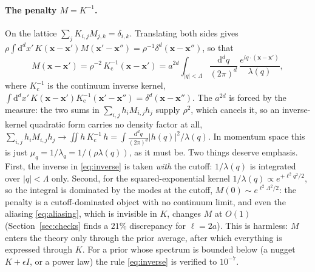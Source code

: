 \documentclass[11pt,a4paper]{article}
\newcommand{\dd}{\mathrm d}
\newcommand{\Lam}{\Lambda}
\newcommand{\ball}[1]{\int_{|q|<\Lam}\frac{\dd^d q}{(2\pi)^d}\,#1}
\begin{document}
\paragraph{The penalty $M = K^{-1}$.}
On the lattice $\sum_jK_{i,j}M_{j,k} = \delta_{i,k}$. Translating both sides gives $\rho\int\dd^dx'\,K(\mathbf x-\mathbf x')M(\mathbf x'-\mathbf x'') = \rho^{-1}\delta^d(\mathbf x-\mathbf x'')$, so that
\begin{equation}
  M(\mathbf x-\mathbf x') = \rho^{-2}\,K^{-1}_{\mathrm c}(\mathbf x-\mathbf x') = a^{2d}\ball{\frac{e^{iq\cdot(\mathbf x-\mathbf x')}}{\lambda(q)}},
  \label{eq:inverse}
\end{equation}
where $K^{-1}_{\mathrm c}$ is the continuum inverse kernel, $\int\dd^dx'\,K(\mathbf x-\mathbf x')K^{-1}_{\mathrm c}(\mathbf x'-\mathbf x'') = \delta^d(\mathbf x-\mathbf x'')$. The $a^{2d}$ is forced by the measure: the two sums in $\sum_{i,j}h_iM_{i,j}h_j$ supply $\rho^2$, which cancels it, so an inverse-kernel quadratic form carries no density factor at all, $\sum_{i,j}h_iM_{i,j}h_j\to\iint h\,K^{-1}_{\mathrm c}\,h = \int\frac{\dd^dq}{(2\pi)^d}|h(q)|^2/\lambda(q)$. In momentum space this is just $\mu_q = 1/\lambda_q = 1/(\rho\lambda(q))$, as it must be. Two things deserve emphasis. First, the inverse in \eqref{eq:inverse} is taken \emph{with} the cutoff: $1/\lambda(q)$ is integrated over $|q|<\Lam$ only. Second, for the squared-exponential kernel $1/\lambda(q)\propto e^{+\ell^2q^2/2}$, so the integral is dominated by the modes at the cutoff, $M(0)\sim e^{\ell^2\Lam^2/2}$: the penalty is a cutoff-dominated object with no continuum limit, and even the aliasing \eqref{eq:aliasing}, which is invisible in $K$, changes $M$ at $O(1)$ (Section~\ref{sec:checks} finds a $21\%$ discrepancy for $\ell = 2a$). This is harmless: $M$ enters the theory only through the prior average, after which everything is expressed through $K$. For a prior whose spectrum is bounded below (a nugget $K+\epsilon I$, or a power law) the rule \eqref{eq:inverse} is verified to $10^{-7}$.
\end{document}
